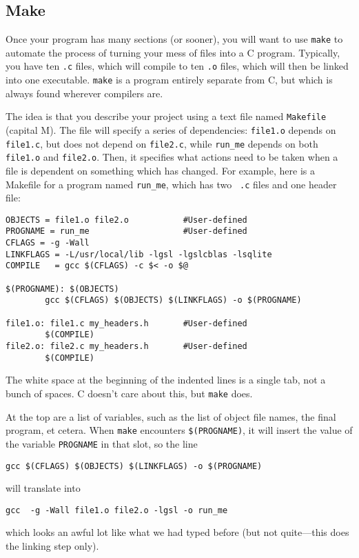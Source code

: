 \documentclass[12pt]{article}
\begin{document}
\subsection{Make} \label{make} 
Once your program has many sections (or sooner), you will want to use
{\tt make} to automate the process of turning your mess of files into
a C program. Typically, you have ten {\tt .c} files, which will compile
to ten {\tt .o} files, which will then be linked into one executable.
 {\tt make} is a program entirely separate from C, but which
is always found wherever compilers are.

The idea is that you describe your project using a
text file named {\tt Makefile} (capital M). The file will specify a
series of dependencies: {\tt file1.o} depends on {\tt file1.c}, but does
not depend on {\tt file2.c}, while {\tt run\_me} depends on both {\tt
file1.o} and {\tt file2.o}.  Then, it specifies what actions need to be taken
when a file is dependent on something which has changed.  For example,
here is a Makefile for a program named {\tt run\_me}, which has two {\tt
.c} files and one header file:

\begin{verbatim}
OBJECTS = file1.o file2.o           #User-defined
PROGNAME = run_me                   #User-defined
CFLAGS = -g -Wall
LINKFLAGS = -L/usr/local/lib -lgsl -lgslcblas -lsqlite
COMPILE   = gcc $(CFLAGS) -c $< -o $@

$(PROGNAME): $(OBJECTS)
        gcc $(CFLAGS) $(OBJECTS) $(LINKFLAGS) -o $(PROGNAME)

file1.o: file1.c my_headers.h       #User-defined
        $(COMPILE)
file2.o: file2.c my_headers.h       #User-defined
        $(COMPILE)
\end{verbatim}

The white space at the beginning of the indented lines is a single tab, not a bunch of spaces.
C doesn't care about this, but {\tt make} does.

At the top are a list of variables, such as the list of object file names, the final program, et cetera.
When {\tt make} encounters {\tt \$(PROGNAME)}, it will insert the value of the variable {\tt PROGNAME} in that
slot, so the line 
\begin{verbatim}
gcc $(CFLAGS) $(OBJECTS) $(LINKFLAGS) -o $(PROGNAME)
\end{verbatim}
will translate into
\begin{verbatim}
gcc  -g -Wall file1.o file2.o -lgsl -o run_me
\end{verbatim}
which looks an awful lot like what we had typed before (but not quite---this does the linking step only).
\end{document}
